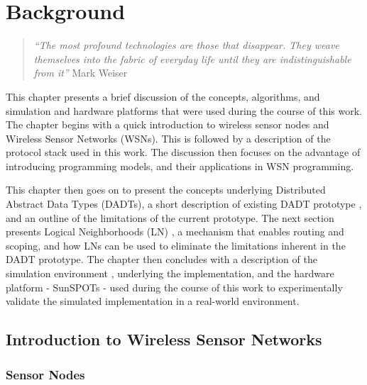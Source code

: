 \chapter{Background}

\begin{quote}
\emph{``The most profound technologies are those that disappear. They weave
themselves into the fabric of everyday life until they are indistinguishable
from it''} 
Mark Weiser \cite{Weiser_ComputerIn21stCentury}
\end{quote}

This chapter presents a brief discussion of the concepts, algorithms, and 
simulation and hardware platforms that were used
during the course of this work. The chapter begins with a quick introduction to 
wireless sensor nodes and Wireless Sensor Networks (WSNs). This is followed by a
description of the protocol stack used in this work. The discussion
then focuses on the advantage of introducing programming models, and their
applications in WSN programming.

This chapter then goes on to present the concepts underlying
Distributed Abstract Data Types (DADTs), a short 
description of existing DADT prototype \cite{migliavacca_DADT:2006}, and  an
outline
of the limitations of the current prototype. The next section presents 
Logical Neighborhoods (LN) \cite{mottola_LNScoping:2006}, a mechanism that
enables routing and scoping, and how LNs can be used to eliminate the
limitations inherent in the DADT prototype. The chapter then concludes 
with a description of the simulation environment \cite{barr_JIST:2005}, \cite{barr_SWANS} underlying the 
implementation, and the hardware platform - SunSPOTs \cite{SunSPOTs}- used during the course of
this work to experimentally validate the simulated implementation in a
real-world environment. 

\section{Introduction to Wireless Sensor Networks}

\subsection{Sensor Nodes}


